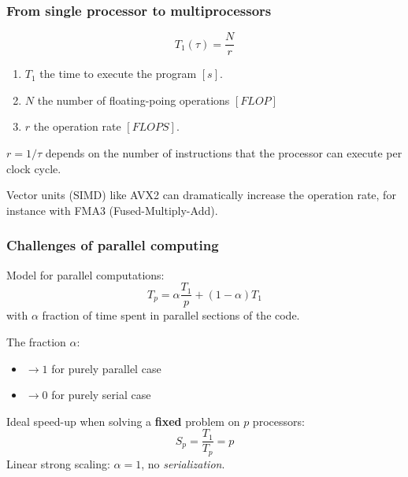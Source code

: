 \begin{frame}
  \frametitle{From single processor to multiprocessors}

\begin{equation*}
T_1(\tau) = \dfrac{N}{r} 
\end{equation*}

\medskip
\begin{enumerate}
\item $T_1$ the time to execute the program $[s]$.
\item $N$ the number of floating-poing operations $[FLOP]$
\item $r$ the operation rate $[FLOPS]$.
\end{enumerate}

\medskip
$r = 1/\tau$ depends on the number of instructions that the processor can execute per clock cycle.

\medskip
Vector units (SIMD) like AVX2 can dramatically increase the operation rate, for instance with FMA3 (Fused-Multiply-Add).

\end{frame}


\begin{frame}
  \frametitle{Challenges of parallel computing}

\medskip
Model for parallel computations:
\begin{equation*}
T_p = \alpha \dfrac{T_1}{p} + (1 - \alpha) T_1
\end{equation*}
with $\alpha$ fraction of time spent in parallel sections of the code.

\medskip
The fraction $\alpha$:
\begin{itemize}
\item $\rightarrow 1$ for purely parallel case\\[2ex]
\item $\rightarrow 0$ for purely serial case
\end{itemize}


\medskip
Ideal speed-up when solving a \textbf{fixed} problem on $p$ processors:
\begin{equation*}
S_p = \dfrac{T_1}{T_p} = p
\end{equation*}
Linear strong scaling: $\alpha = 1$, no \textit{serialization}.

\end{frame}


